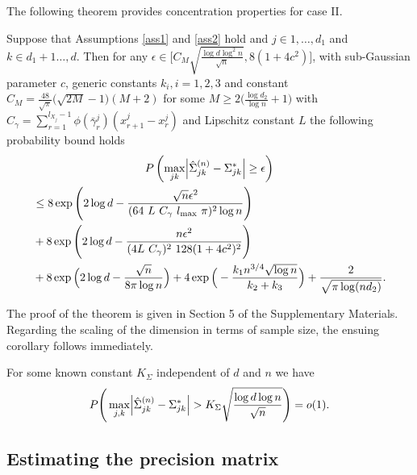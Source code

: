 \noindent The following theorem provides concentration properties for case II.
\begin{theorem}\label{concentration_caseII}
    Suppose that Assumptions \ref{ass1} and \ref{ass2} hold and $j \in 1, \dots, d_1$ and $k \in d_1+1 \dots, d$. Then for any $\epsilon \in \Big[C_M\sqrt{\frac{\log d \log^2 n}{\sqrt{n}}},8(1+4c^2)\Big]$, with sub-Gaussian parameter $c$, generic constants $k_i, i = 1,2,3$ and constant $C_M = \frac{48}{\sqrt{\pi}} \big(\sqrt{2M} - 1\big)(M+2)$ for some $M \geq 2\big(\frac{\log d_2}{\log n} +1\big)$ with $C_\gamma = \sum_{r=1}^{l_{X_j}-1} \phi(\bar{\gamma}^j_r)(x^j_{r+1} - x^j_r)$ and Lipschitz constant $L$ the following probability bound holds
    \begin{multline*}
        P\left(\max_{jk}\abs{\hat{\Sigma}_{jk}^{(n)} -  \Sigma_{jk}^{*}} \geq \epsilon \right) \\
        \begin{aligned}
        &\leq 8\exp\Bigg(2\log d - \frac{\sqrt{n}\epsilon^2}{(64 \ L \ C_\gamma \ l_{\max} \ \pi)^2 \log n}\Bigg) \\
        &+ 8\exp\left( 2\log d - \frac{n \epsilon^2}{(4L \ C_\gamma)^2 \ 128(1+4c^2)^2} \right) \\
        &+ 8\exp\Big(2\log d - \frac{\sqrt{n}}{8\pi\log n}\Big) + 4\exp\Big(- \frac{k_1 n^{3/4} \sqrt{\log n}}{k_2+ k_3} \Big) + \frac{2}{\sqrt{\pi \log(nd_2)}}.
        \end{aligned}
    \end{multline*}

\end{theorem}
The proof of the theorem is given in Section 5
of the Supplementary Materials. Regarding the scaling of the dimension in terms of sample size, the ensuing corollary follows immediately.
\begin{corollary}
    For some known constant $K_{\Sigma}$ independent of $d$ and $n$ we have
    \begin{equation}
        P\Bigg(\max_{j,k}\abs{\hat{\Sigma}_{jk}^{(n)} - \Sigma_{jk}^*} > K_{\Sigma}\sqrt{\frac{\log d \log n}{\sqrt{n}}} \Bigg) = o(1).
    \end{equation}
\end{corollary}

\subsection{Estimating the precision matrix}\label{sec:precision_matrix}


